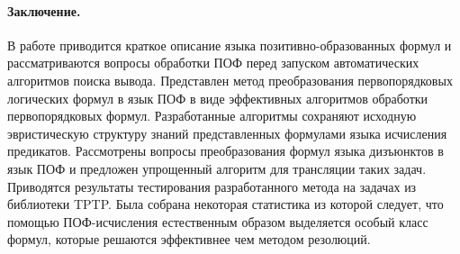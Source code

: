 \documentclass[a4paper]{jctart15b}
\begin{document}




\paragraph{Заключение.}

В работе приводится краткое описание языка позитивно-образованных формул и рассматриваются вопросы обработки ПОФ перед запуском автоматических алгоритмов поиска вывода. Представлен метод преобразования первопорядковых логических формул в язык ПОФ в виде эффективных алгоритмов обработки первопорядковых формул. Разработанные алгоритмы сохраняют исходную эвристическую структуру знаний представленных формулами языка исчисления предикатов. Рассмотрены вопросы преобразования формул языка дизъюнктов в язык ПОФ и предложен упрощенный алгоритм для трансляции таких задач. Приводятся результаты тестирования разработанного метода на задачах из библиотеки TPTP. Была собрана некоторая статистика из которой следует, что помощью ПОФ-исчисления естественным образом выделяется особый класс формул, которые решаются эффективнее чем методом резолюций.
\end{document}
